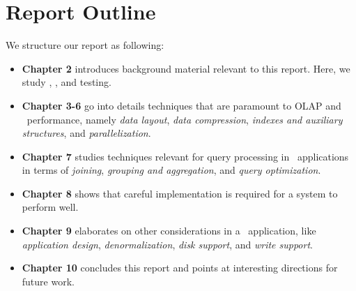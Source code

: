 \section{Report Outline}
\label{sec:Thesis Outline}
We structure our report as following:
\begin{itemize}
  \item \textbf{Chapter 2} introduces background material relevant to this report. Here, we study \bi, \bd, and testing.
  \item \textbf{Chapter 3-6} go into details techniques that are paramount to OLAP and \bd~performance, namely \textit{data layout}, \textit{data compression}, \textit{indexes and auxiliary structures}, and \textit{parallelization}.
  \item \textbf{Chapter 7} studies techniques relevant for query processing in \bd~applications in terms of \textit{joining}, \textit{grouping and aggregation}, and \textit{query optimization}.
  \item \textbf{Chapter 8} shows that careful implementation is required for a system to perform well.
  \item \textbf{Chapter 9} elaborates on other considerations in a \bd~application, like \textit{application design}, \textit{denormalization}, \textit{disk support}, and \textit{write support}.
  \item \textbf{Chapter 10} concludes this report and points at interesting directions for future work.
\end{itemize}
